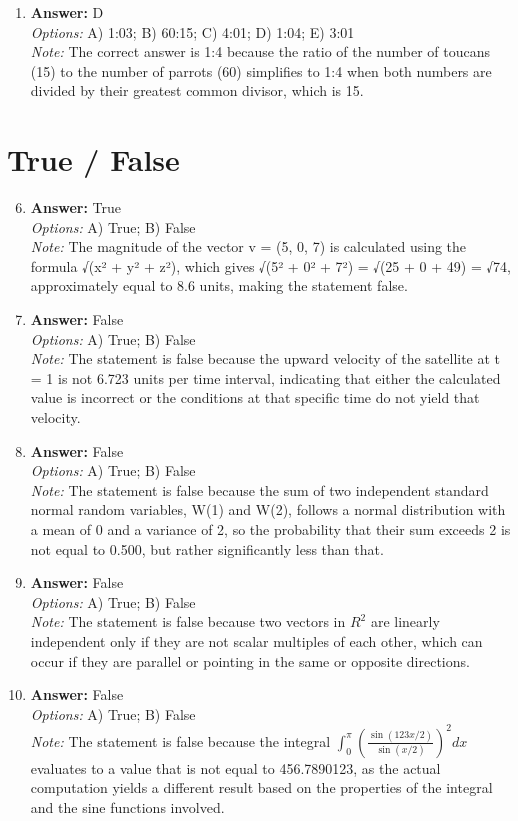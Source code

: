 \documentclass[12pt]{article}
\begin{document}
\begin{enumerate}[label=\arabic*.]
\item \textbf{Answer:} D
\\ \textit{Options:} A) 1:03; B) 60:15; C) 4:01; D) 1:04; E) 3:01
\\ \textit{Note:} The correct answer is 1:4 because the ratio of the number of toucans (15) to the number of parrots (60) simplifies to 1:4 when both numbers are divided by their greatest common divisor, which is 15.
\end{enumerate}

\section*{True / False}
\begin{enumerate}[label=\arabic*.]
\setcounter{enumi}{5}
\item \textbf{Answer:} True
\\ \textit{Options:} A) True; B) False
\\ \textit{Note:} The magnitude of the vector v = (5, 0, 7) is calculated using the formula √(x² + y² + z²), which gives √(5² + 0² + 7²) = √(25 + 0 + 49) = √74, approximately equal to 8.6 units, making the statement false.
\item \textbf{Answer:} False
\\ \textit{Options:} A) True; B) False
\\ \textit{Note:} The statement is false because the upward velocity of the satellite at t = 1 is not 6.723 units per time interval, indicating that either the calculated value is incorrect or the conditions at that specific time do not yield that velocity.
\item \textbf{Answer:} False
\\ \textit{Options:} A) True; B) False
\\ \textit{Note:} The statement is false because the sum of two independent standard normal random variables, W(1) and W(2), follows a normal distribution with a mean of 0 and a variance of 2, so the probability that their sum exceeds 2 is not equal to 0.500, but rather significantly less than that.
\item \textbf{Answer:} False
\\ \textit{Options:} A) True; B) False
\\ \textit{Note:} The statement is false because two vectors in $R^2$ are linearly independent only if they are not scalar multiples of each other, which can occur if they are parallel or pointing in the same or opposite directions.
\item \textbf{Answer:} False
\\ \textit{Options:} A) True; B) False
\\ \textit{Note:} The statement is false because the integral $\int_{0}^\pi \left(\frac{\sin(123 x/2)}{\sin(x/2)}\right)^2 dx$ evaluates to a value that is not equal to 456.7890123, as the actual computation yields a different result based on the properties of the integral and the sine functions involved.
\end{enumerate}
\end{document}
